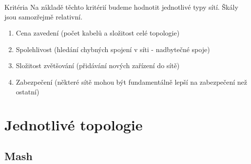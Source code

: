 \documentclass{beamer}
\begin{document}
\begin{frame}{Kritéria}
 Na základě těchto kritérií budeme hodnotit jednotlivé typy sítí. Škály jsou
 samozřejmě relativní.

 \begin{enumerate}
 	\item Cena zavedení (počet kabelů a složitost celé topologie)
 	\item Spolehlivost (hledání chybných spojení v síti - nadbytečné spoje)
 	\item Složitost zvětšování (přidávání nových zařízení do sítě)
 	\item Zabezpečení (některé sítě mohou být fundamentálně lepší na zabezpečení
 	 než ostatní)
 \end{enumerate} 
\end{frame}


\section{Jednotlivé topologie}
\label{sec:jednotlive-topologie}


\subsection{Mash}
\label{sec:mash}
\end{document}
